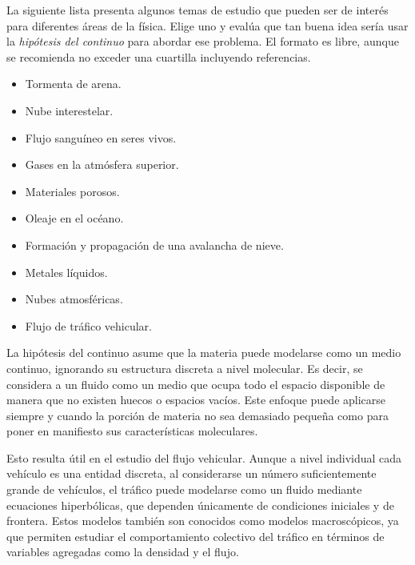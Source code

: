 \documentclass[../main.tex]{subfiles}
\begin{document}
\begin{problema}
	La siguiente lista presenta algunos temas de estudio que pueden ser de
	interés para diferentes áreas de la física. Elige uno y evalúa que tan
	buena idea sería usar la \emph{hipótesis del continuo} para abordar ese
	problema. El formato es libre, aunque se recomienda no exceder una
	cuartilla incluyendo referencias.

	\begin{itemize}[twocol]
		\item Tormenta de arena.
		\item Nube interestelar.
		\item Flujo sanguíneo en seres vivos.
		\item Gases en la atmósfera superior.
		\item Materiales porosos.
		\item Oleaje en el océano.
		\item Formación y propagación de una avalancha de nieve.
		\item Metales líquidos.
		\item  Nubes atmosféricas.
		\item Flujo de tráfico vehicular.
	\end{itemize}

	\startsolution

	La hipótesis del continuo asume que la materia puede modelarse como un medio
	continuo, ignorando su estructura discreta a nivel molecular.
	Es decir, se considera a un fluido como un medio
	que ocupa todo el espacio disponible de manera que no existen huecos
	o espacios vacíos. Este enfoque puede aplicarse siempre y cuando
	la porción de materia no sea demasiado pequeña como para poner
	en manifiesto sus características moleculares.

	Esto resulta útil en el estudio del flujo vehicular. Aunque a nivel individual
	cada vehículo es una entidad discreta, al considerarse un número suficientemente
	grande de vehículos, el tráfico puede modelarse como un fluido mediante ecuaciones
	hiperbólicas, que dependen únicamente de condiciones iniciales y de frontera. Estos
	modelos también son conocidos como modelos macroscópicos, ya que permiten estudiar
	el comportamiento colectivo del tráfico en términos de variables agregadas como la
	densidad y el flujo.
\end{problema}
\end{document}

